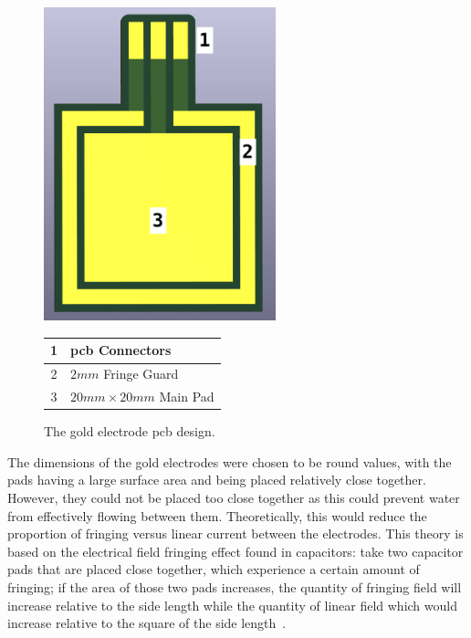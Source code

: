 \begin{figure}[ht]
    \begin{minipage}{0.5\textwidth}
        
    \centering
    \includegraphics[width=0.6\textwidth]{Figures/GoldElectrode}
\end{minipage}
\begin{minipage}{0.5\textwidth}
    \begin{tabular}{cl} \hline
        1 & \gls{pcb} Connectors \\ \hline
        2 & $2mm$ Fringe Guard \\ \hline
        3 & $20mm \times 20mm$ Main Pad \\ \hline
    \end{tabular}
\end{minipage}
    \caption{The gold electrode \gls{pcb} design.}
    \label{fig:gold-electrode} %
\end{figure}

The dimensions of the gold electrodes were chosen to be round values, with the pads having a large surface area and being placed relatively close together.
However, they could not be placed too close together as this could prevent water from effectively flowing between them.
Theoretically, this would reduce the proportion of fringing versus linear current between the electrodes.
This theory is based on the electrical field fringing effect found in capacitors: take two capacitor pads that are placed close together, which experience a certain amount of fringing; if the area of those two pads increases, the quantity of fringing field will increase relative to the side length while the quantity of linear field which would increase relative to the square of the side length~\cite{hegg_capacitor_electric_fringing_2004, sloggett_fringing_fields_in_disc_1986}.

